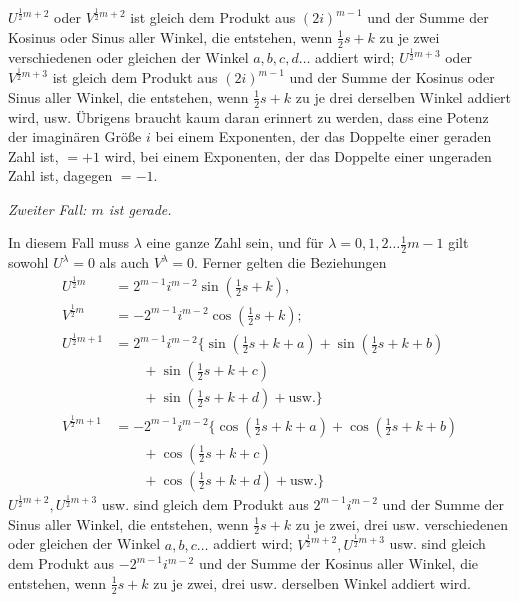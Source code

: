 $U^{\frac12m+2}$ oder $V^{\frac12m+2}$ ist gleich dem Produkt aus $(2i)^{m-1}$ und der Summe der Kosinus oder Sinus aller Winkel, die entstehen, wenn $\frac12s+k$ zu je zwei verschiedenen oder gleichen der Winkel $a,b,c,d\ldots$ addiert wird; $U^{\frac12m+3}$ oder $V^{\frac12m+3}$ ist gleich dem Produkt aus $(2i)^{m-1}$ und der Summe der Kosinus oder Sinus aller Winkel, die entstehen, wenn $\frac12s+k$ zu je drei derselben Winkel addiert wird, usw. Übrigens braucht kaum daran erinnert zu werden, dass eine Potenz der imaginären Größe $i$ bei einem Exponenten, der das Doppelte einer geraden Zahl ist, $=+1$ wird, bei einem Exponenten, der das Doppelte einer ungeraden Zahl ist, dagegen $=-1$.
\begin{center}\textit{Zweiter Fall: $m$ ist gerade.}\end{center}
In diesem Fall muss $\lambda$ eine ganze Zahl sein, und für $\lambda=0,1,2\ldots\frac12m-1$ gilt sowohl $U^\lambda=0$ als auch $V^\lambda=0$. Ferner gelten die Beziehungen
\[
\begin{aligned}
U^{\frac12m}&=2^{m-1}i^{m-2}\sin(\tfrac12s+k),\\
V^{\frac12m}&=-2^{m-1}i^{m-2}\cos(\tfrac12s+k);\\
U^{\frac12m+1}&=2^{m-1}i^{m-2}\{\sin(\tfrac12s+k+a)+\sin(\tfrac12s+k+b)\\&\qquad+\sin(\tfrac12s+k+c)\\
&\qquad+\sin(\tfrac12s+k+d)+\text{usw.}\}\\
V^{\frac12m+1}&=-2^{m-1}i^{m-2}\{\cos(\tfrac12s+k+a)+\cos(\tfrac12s+k+b)\\&\qquad+\cos(\tfrac12s+k+c)\\
&\qquad+\cos(\tfrac12s+k+d)+\text{usw.}\}
\end{aligned}
\]
$U^{\frac12m+2},U^{\frac12m+3}$ usw. sind gleich dem Produkt aus $2^{m-1}i^{m-2}$ und der Summe der Sinus aller Winkel, die entstehen, wenn $\frac12s+k$ zu je zwei, drei usw. verschiedenen oder gleichen der Winkel $a,b,c\ldots$ addiert wird; $V^{\frac12m+2},U^{\frac12m+3}$ usw. sind gleich dem Produkt aus $-2^{m-1}i^{m-2}$ und der Summe der Kosinus aller Winkel, die entstehen, wenn $\frac12s+k$ zu je zwei, drei usw. derselben Winkel addiert wird.
\endgroup
